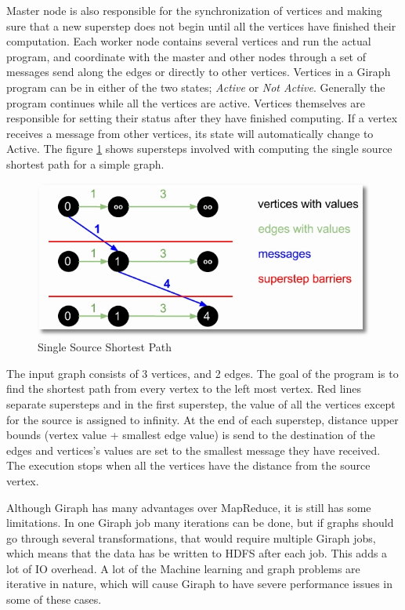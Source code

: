 \documentclass[english]{tktltiki}
\begin{document}
Master node is also responsible for the synchronization of vertices and making sure that a new superstep does not begin until all the vertices have finished their computation. 
Each worker node contains several vertices and run the actual program, and coordinate with the master and other nodes through a set of messages send along the edges or directly to other vertices. 
Vertices in a Giraph program can be in either of the two states; \textit{Active} or \textit{Not Active}.
Generally the program continues while all the vertices are active. 
Vertices themselves are responsible for setting their status after they have finished computing. 
If a vertex receives a message from other vertices, its state will automatically change to Active.
The figure \ref{fig:sssp} shows supersteps involved with computing the single source shortest path for a simple graph.
\begin{figure}[ht!]
\centering
\includegraphics[width=150mm]{figures/giraphsuperstep.jpg}
\caption{Single Source Shortest Path  \protect \footnotemark}
\label{fig:sssp}
\end{figure}

The input graph consists of 3 vertices, and 2 edges. 
The goal of the program is to find the shortest path from every vertex to the left most vertex. 
Red lines separate supersteps and in the first superstep, the value of all the vertices except for the source is assigned to infinity. 
At the end of each superstep, distance upper bounds (vertex value + smallest edge value) is send to the destination of the edges and vertices's values are set to the smallest message they have received. 
The execution stops when all the vertices have the distance from the source vertex. 

Although Giraph has many advantages over MapReduce, it is still has some limitations.
In one Giraph job many iterations can be done, but if graphs should go through several transformations, that would require multiple Giraph jobs, which means that the data has be written to HDFS after each job. 
This adds a lot of IO overhead. 
A lot of the Machine learning and graph problems are iterative in nature, which will cause Giraph to have severe performance issues in some of these cases.
\end{document}
